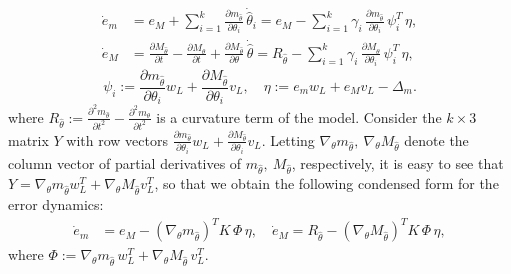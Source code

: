 \documentclass[letterpaper, 10 pt, conference]{ieeeconf}  %
\newcounter{part} %
\begin{document}
\begin{equation*}
\begin{aligned}
\dot e_m &= e_M + \sum_{i=1}^k \frac{\partial m_{\hat\theta}}{\partial \theta_i}\,\dot{\hat\theta}_i = e_M - \sum_{i=1}^k \gamma_i\,\frac{\partial m_{\hat\theta}}{\partial \theta_i}\,
\psi_i^{\!T}\,\eta,\\[2mm]
\dot e_M &= \frac{\partial M_{\hat\theta}}{\partial t} - \frac{\partial M_{\theta}}{\partial t}
+ \frac{\partial M_{\hat\theta}}{\partial \theta}\,\dot{\hat\theta}= R_{\hat\theta} - \sum_{i=1}^k \gamma_i\,\frac{\partial M_{\hat\theta}}{\partial \theta_i}\,
\psi_i^{\!T}\,\eta,
\end{aligned}
\end{equation*}
\begin{equation*}
\psi_i := \frac{\partial m_{\hat\theta}}{\partial \theta_i}w_L
        + \frac{\partial M_{\hat\theta}}{\partial \theta_i}v_L,
\quad
\eta := e_m w_L + e_M v_L - \Delta_m .
\end{equation*} where $R_{\hat{\theta}} := \displaystyle\frac{\partial^2 m_{\hat{\theta}}}{\partial t^2} - \frac{\partial^2 m_\theta}{\partial t^2}$ is a curvature term of the model. Consider the $k \times 3$ matrix $Y$ with row vectors $\frac{\partial m_{\hat{\theta}}}{\partial \theta_i}w_L + \frac{\partial M_{\hat{\theta}}}{\partial \theta_i}v_L$. Letting $\nabla_\theta m_{\hat{\theta}}, \ \nabla_\theta M_{\hat{\theta}}$ denote the column vector of partial derivatives of $m_{\hat{\theta}}, \  M_{\hat{\theta}}$, respectively, it is easy to see that $Y = \nabla_\theta m_{\hat{\theta}} w_L^T + \nabla_\theta M_{\hat{\theta}} v_L^T$, so that we obtain the following condensed form for the error dynamics:
\begin{align*}
\dot e_m &= e_M - (\nabla_{\theta} m_{\hat{\theta}})^T K\, \Phi\, \eta,\quad\dot e_M = R_{\hat{\theta}} - (\nabla_{\theta} M_{\hat{\theta}})^T K\, \Phi\, \eta,
\end{align*}
where
$\Phi := \nabla_\theta m_{\hat{\theta}}\, w_L^T + \nabla_\theta M_{\hat{\theta}}\, v_L^T$.
\end{document}
